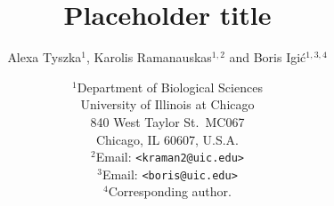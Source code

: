 \documentclass[11pt,letterpaper,titlepage]{article}
\begin{document}
\title{\Large\bf{Placeholder title}}
\author{Alexa Tyszka$^{1}$, Karolis Ramanauskas$^{1,2}$ and Boris Igi\'{c}$^{1,3,4}$}
\date{
    $^1$Department of Biological Sciences\\
    University of Illinois at Chicago\\
    840 West Taylor St.\ MC067\\
    Chicago, IL 60607, U.S.A.\\
    [\baselineskip]
    $^2$Email: {\tt<kraman2@uic.edu>}\\
    $^3$Email: {\tt<boris@uic.edu>}\\
    $^4$Corresponding author.\\
}
\maketitle

\end{document}
